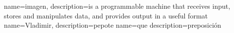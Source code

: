 {
  name={imagen},
  description={is a programmable machine that receives input,
               stores and manipulates data, and provides
               output in a useful format}
}
{
  name={Vladimir},
  description={pepote}
}
{
  name={que}
  description={preposición}
}